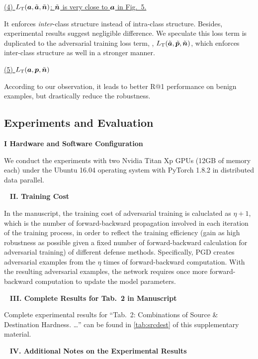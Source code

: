 \ul{(4) $L_\text{T}({\bm{a}}, \tilde{{\bm{a}}}, \tilde{{\bm{n}}})$: $\tilde{{\bm{n}}}$ is very close to ${\bm{a}}$ in Fig.~5.}

It enforces \emph{inter}-class structure instead of intra-class structure.
%
Besides, experimental results suggest negligible difference.
%
We speculate this loss term is duplicated to the adversarial training loss term,
\ie, $L_\text{T}(\tilde{{\bm{a}}}, \tilde{{\bm{p}}}, \tilde{{\bm{n}}})$, which enforces
inter-class structure as well in a stronger manner.

\ul{(5) $L_\text{T}({\bm{a}}, {\bm{p}}, \tilde{{\bm{n}}})$}

According to our observation, it leads to better R@1 performance on benign
examples, but drastically reduce the robustness.

\subsection{Experiments and Evaluation}

\noindent\textbf{I Hardware and Software Configuration}

We conduct the experiments with two Nvidia Titan Xp GPUs (12GB of memory each)
under the Ubuntu 16.04 operating system with PyTorch 1.8.2 in distributed data
parallel.

~\newline
\noindent\textbf{II. Training Cost}

In the manuscript, the training cost of adversarial training is caluclated as
$\eta+1$, which is the number of forward-backward propagation involved in each
iteration of the training process, in order to reflect the training efficiency
(gain as high robustness as possible given a fixed number of forward-backward
calculation for adversarial training) of different defense methods.
%
Specifically, PGD creates adversarial examples from the $\eta$ times of
forward-backward computation.
%
With the resulting adversarial examples, the network requires once
more forward-backward computation to update the model parameters.

~\newline
\noindent\textbf{III. Complete Results for Tab.~2 in Manuscript}



Complete experimental results for ``Tab.~2: Combinations of Source \&
Destination Hardness. \ldots'' can be found in \cref{tab:srcdest} of this
supplementary material.

~\newline
\noindent\textbf{IV. Additional Notes on the Experimental Results}

